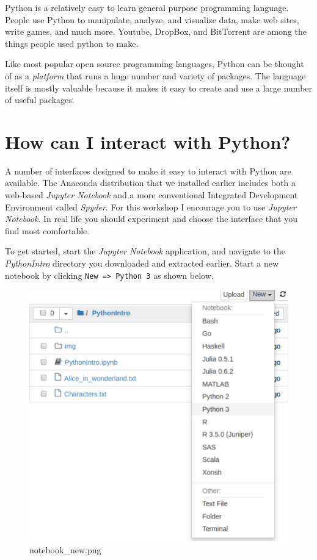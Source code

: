 \documentclass[]{book}
\begin{document}
Python is a relatively easy to learn general purpose programming
language. People use Python to manipulate, analyze, and visualize data,
make web sites, write games, and much more. Youtube, DropBox, and
BitTorrent are among the things people used python to make.

Like most popular open source programming languages, Python can be
thought of as a \emph{platform} that runs a huge number and variety of
packages. The language itself is mostly valuable because it makes it
easy to create and use a large number of useful packages.

\section{How can I interact with
Python?}\label{how-can-i-interact-with-python}

A number of interfaces designed to make it easy to interact with Python
are available. The Anaconda distribution that we installed earlier
includes both a web-based \emph{Jupyter Notebook} and a more
conventional Integrated Development Environment called \emph{Spyder}.
For this workshop I encourage you to use \emph{Jupyter Notebook}. In
real life you should experiment and choose the interface that you find
most comfortable.

To get started, start the \emph{Jupyter Notebook} application, and
navigate to the \emph{PythonIntro} directory you downloaded and
extracted earlier. Start a new notebook by clicking
\texttt{New\ =\textgreater{}\ Python\ 3} as shown below.

\begin{figure}
\centering
\includegraphics{Python/PythonIntro/images/notebook_new.png}
\caption{notebook\_new.png}
\end{figure}
\end{document}

